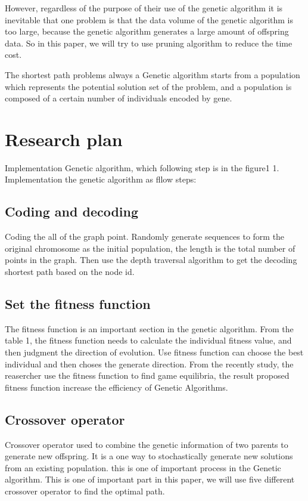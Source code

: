 \documentclass[12pt]{article}
\begin{document}
However, regardless of the purpose of their use of the genetic algorithm it is inevitable that one problem is that the data volume of the genetic algorithm is too large, because the genetic algorithm generates a large amount of offspring data. So in this paper, we will try to use pruning algorithm to reduce the time cost.

The shortest path problems always a Genetic algorithm starts from a population which represents the potential solution set of the problem, and a population is composed of a certain number of individuals encoded by gene. 
 



\section{Research plan}
Implementation Genetic algorithm, which following step is in the figure1
1. Implementation the genetic algorithm as fllow steps:
\subsection{Coding and decoding}
Coding the all of the graph point. Randomly generate sequences to form the original chromosome as the initial population, the length is the total number of points in the graph. Then use the depth traversal algorithm to get the decoding shortest path based on the node id.
\subsection{Set the fitness function}
The fitness function is an important section in the genetic algorithm. From the table 1, the fitness function needs to calculate the individual fitness value, and then judgment the direction of evolution. Use fitness function can choose the best individual and then choses the generate direction. From the recently study\cite{Gunturu2017}, the reasercher use the fitness function to find game equilibria, the result proposed  fitness function increase the efficiency of Genetic Algorithms. 
\subsection{Crossover operator }
Crossover operator used to combine the genetic information of two parents to generate new offspring. It is a one way to stochastically generate new solutions from an existing population. this is one of important process in the Genetic algorithm. This is one of important part in this paper, we will use five different crossover operator to find the optimal path.
\end{document}
